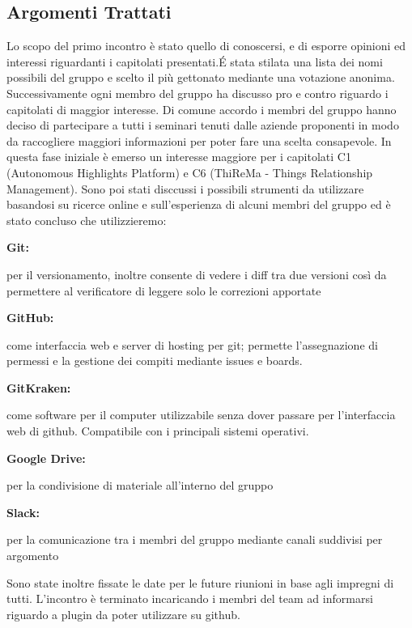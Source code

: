 \documentclass{article}
\begin{document}
    \subsection{Argomenti Trattati}
    Lo scopo del primo incontro è stato quello di conoscersi, e di esporre opinioni ed interessi riguardanti i capitolati presentati.\'E stata stilata una lista dei nomi possibili del gruppo e scelto il più gettonato mediante una votazione anonima. Successivamente ogni membro del gruppo ha discusso pro e contro riguardo i capitolati di maggior interesse. Di comune accordo i membri del gruppo hanno deciso di partecipare a tutti i seminari tenuti dalle aziende proponenti in modo da raccogliere maggiori informazioni per poter fare una scelta consapevole. In questa fase iniziale è emerso un interesse maggiore per i capitolati C1 (Autonomous Highlights Platform) e C6 (ThiReMa - Things Relationship Management). Sono poi stati disccussi i possibili strumenti da utilizzare basandosi su ricerce online e sull'esperienza di alcuni membri del gruppo ed è stato concluso che utilizzieremo:
	\begin{itemize}
	    {\item\bfseries Git:} per il versionamento, inoltre consente di vedere i diff tra due versioni così da permettere al verificatore di leggere solo le correzioni apportate
	    {\item\bfseries GitHub:} come interfaccia web e server di hosting per git; permette l'assegnazione di permessi e la gestione dei compiti mediante issues e boards.
	    {\item\bfseries GitKraken:} come software per il computer utilizzabile senza dover passare per l'interfaccia web di github. Compatibile con i principali sistemi operativi.
	    {\item\bfseries Google Drive:} per la condivisione di materiale all'interno del gruppo
	    {\item\bfseries Slack:} per la comunicazione tra i membri del gruppo mediante canali suddivisi per argomento
	\end{itemize}
	Sono state inoltre fissate le date per le future riunioni in base agli impregni di tutti.
	L'incontro è terminato incaricando i membri del team ad informarsi riguardo a plugin da poter utilizzare su github.
	\newpage
\end{document}
